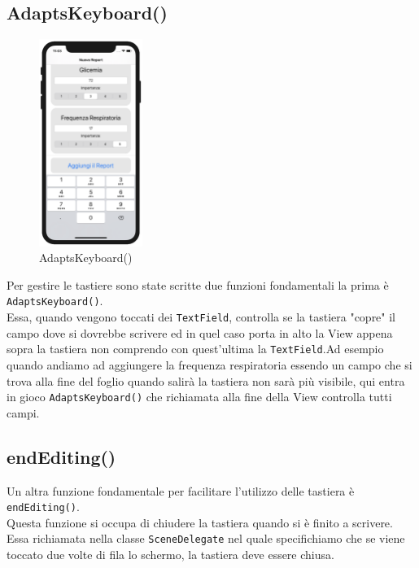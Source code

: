\documentclass{article}
\begin{document}
\subsection{AdaptsKeyboard()}
\begin{figure}
  \begin{center}
    \includegraphics[width=0.3\textwidth]{img/tastiera.png}
  \end{center}
\caption{AdaptsKeyboard()}
\end{figure}
Per gestire le tastiere sono state scritte due funzioni fondamentali la prima è \texttt{AdaptsKeyboard()}.\\
Essa, quando vengono toccati dei \texttt{TextField}, controlla se la tastiera "copre" il campo dove si dovrebbe scrivere ed in quel caso porta in alto la View appena sopra la tastiera non comprendo con quest'ultima la \texttt{TextField}.Ad esempio quando andiamo ad aggiungere la frequenza respiratoria essendo un campo che si trova alla fine del foglio quando salirà la tastiera non sarà più visibile, qui entra in gioco \texttt{AdaptsKeyboard()} che richiamata alla fine della View controlla tutti campi. 

\subsection{endEditing()}

Un altra funzione fondamentale per facilitare l'utilizzo delle tastiera è \texttt{endEditing()}.\\
Questa funzione si occupa di chiudere la tastiera quando si è finito a scrivere. Essa richiamata nella classe \texttt{SceneDelegate} nel quale specifichiamo che se viene toccato due volte di fila lo schermo, la tastiera deve essere chiusa. 
\end{document}
